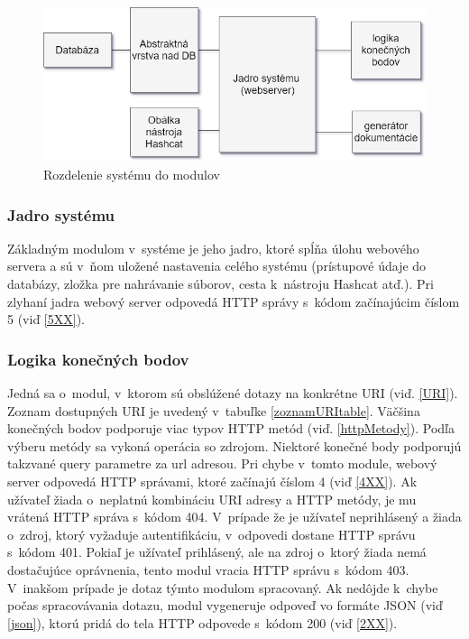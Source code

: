 \documentclass[zadani,slovak]{fitthesis}
\begin{document}
\begin{figure}[h]
    \centering
    \includegraphics[scale=0.6]{obrazky/moduly.png}
    \caption{Rozdelenie systému do modulov}
    \label{fig:moduly}
\end{figure}

\subsubsection{Jadro systému}
Základným modulom v~systéme je jeho jadro, ktoré spĺňa úlohu webového servera a sú v~ňom uložené nastavenia celého systému (prístupové údaje do databázy, zložka pre nahrávanie súborov, cesta k~nástroju Hashcat atď.). Pri zlyhaní jadra webový server odpovedá HTTP správy s~kódom začínajúcim číslom 5 (viď \ref{5XX}).


\subsubsection{Logika konečných bodov}
Jedná sa o~modul, v~ktorom sú obslúžené dotazy na konkrétne URI (viď. \ref{URI}). Zoznam dostupných URI je uvedený v~tabuľke \ref{zoznamURItable}. Väčšina konečných bodov podporuje viac typov HTTP metód (viď. \ref{httpMetody}). Podľa výberu metódy sa vykoná operácia so zdrojom. Niektoré konečné body podporujú takzvané query parametre za url adresou. Pri chybe v~tomto module, webový server odpovedá HTTP správami, ktoré začínajú číslom 4 (viď \ref{4XX}). Ak užívateľ žiada o~neplatnú kombináciu URI adresy a HTTP metódy, je mu vrátená HTTP správa s~kódom 404. V~prípade že je užívateľ neprihlásený a žiada o~zdroj, ktorý vyžaduje autentifikáciu, v~odpovedi dostane HTTP správu s~kódom 401. Pokiaľ je užívateľ prihlásený, ale na zdroj o~ktorý žiada nemá dostačujúce oprávnenia, tento modul vracia HTTP správu s~kódom 403. V~inakšom prípade je dotaz týmto modulom spracovaný. Ak nedôjde k~chybe počas spracovávania dotazu, modul vygeneruje odpoveď vo formáte JSON (viď \ref{json}), ktorú pridá do tela HTTP odpovede s~kódom 200 (viď \ref{2XX}).
\end{document}
